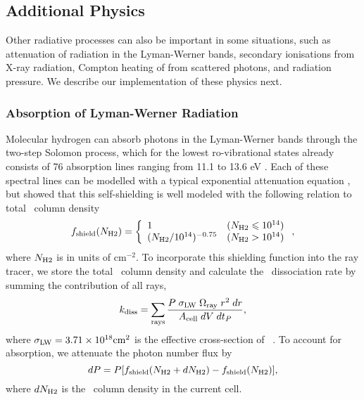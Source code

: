 \documentclass[useAMS,usenatbib]{mn2e}
\begin{document}
\subsection{Additional Physics}
\label{sec:addphysics}

Other radiative processes can also be important in some situations,
such as attenuation of radiation in the Lyman-Werner bands, secondary
ionisations from X-ray radiation, Compton heating of from scattered
photons, and radiation pressure.  We describe our implementation of
these physics next.

\subsubsection{Absorption of Lyman-Werner Radiation}

Molecular hydrogen can absorb photons in the Lyman-Werner bands
through the two-step Solomon process, which for the lowest
ro-vibrational states already consists of 76 absorption lines ranging
from 11.1 to 13.6 eV \citep{Stecher67, Dalgarno70, Haiman00}.  Each of
these spectral lines can be modelled with a typical exponential
attenuation equation \citep{Ricotti01}, but \citet{Draine96} showed
that this self-shielding is well modeled with the following relation
to total \hh~column density
%
\begin{equation}
  \label{eqn:lwband}
  f_{\rm shield} (N_{\rm H2}) =
  \left\{ \begin{array}{l@{\quad}l}
      1 & (N_{\rm H2} \le 10^{14})\\
      (N_{\rm H2}/10^{14})^{-0.75} & (N_{\rm H2} >
      10^{14})
    \end{array} \right. ,
\end{equation}
where $N_{\rm H2}$ is in units of cm$^{-2}$.  To incorporate this
shielding function into the ray tracer, we store the total \hh~column
density and calculate the \hh~dissociation rate by summing the
contribution of all rays,
%
\begin{equation}
  \label{eqn:lwRT}
  k_{\rm diss} = \sum_{\rm rays} \frac{P \; \sigma_{\rm LW} \;
    \Omega_{\rm ray} \; r^2 \; dr}{A_{\rm cell} \; dV \; dt_P},
\end{equation}
where $\sigma_{\rm LW} = 3.71 \times 10^{18} \mathrm{cm}^2$ is the
effective cross-section of \hh~\citep{Abel97}.  To account for
absorption, we attenuate the photon number flux by
%
\begin{equation}
  \label{eqn:LWdP}
  dP = P [f_{\rm shield}(N_{\rm H2} + dN_{\rm H2}) - f_{\rm shield}(N_{\rm H2})],
\end{equation}
where $dN_{\rm H2}$ is the \hh~column density in the current cell.
\end{document}
